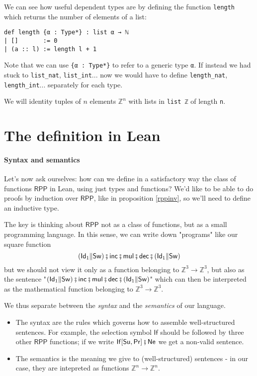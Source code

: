 \documentclass{book}
\theoremstyle{definition}
\theoremstyle{remark}
\theoremstyle{plain}
\newcommand{\Z}{\mathbb{Z}}
\newcommand{\RPP}{\mathsf{RPP}}
\newcommand{\rppId}{\mathsf{Id}}
\newcommand{\rppNe}{\mathsf{Ne}}
\newcommand{\rppSu}{\mathsf{Su}}
\newcommand{\rppPr}{\mathsf{Pr}}
\newcommand{\rppSw}{\mathsf{Sw}}
\newcommand{\rppCo}{\fatsemi}
\newcommand{\rppPa}{\Vert}
\newcommand{\rppIf}{\mathsf{If}}
\newcommand{\rppinc}{\mathsf{inc}}
\newcommand{\rppdec}{\mathsf{dec}}
\newcommand{\rppmul}{\mathsf{mul}}
\begin{document}
We can see how useful dependent types are by defining the function \lstinline{length}
which returns the number of elements of a list:
\begin{lstlisting}
def length {α : Type*} : list α → ℕ
| []       := 0
| (a :: l) := length l + 1
\end{lstlisting}
Note that we can use \lstinline|{α : Type*}| to refer to a generic type \lstinline{α}.
If instead we had stuck to \lstinline{list_nat}, \lstinline{list_int}...
now we would have to define \lstinline{length_nat}, \lstinline{length_int}... separately for each type.

We will identity tuples of $n$ elements $\Z^n$ with lists in \lstinline{list ℤ} of length \lstinline{n}.

\section{The definition in Lean}

\paragraph{Syntax and semantics}
Let's now ask ourselves: how can we define in a satisfactory way the class of functions $\RPP$ in Lean,
using just types and functions?
We'd like to be able to do proofs by induction over $\RPP$, like in proposition \ref{rppinv}, so we'll need to define an inductive type.

The key is thinking about $\RPP$ not as a class of functions, but as a small programming language.
In this sense, we can write down "programs" like our square function
\[(\rppId_1 \rppPa \rppSw) \rppCo \rppinc \rppCo \rppmul \rppCo \rppdec \rppCo (\rppId_1 \rppPa \rppSw)\]
but we should not view it only as a function belonging to $\Z^3 \to \Z^3$,
but also as the sentence
"$(\rppId_1 \rppPa \rppSw) \rppCo \rppinc \rppCo \rppmul \rppCo \rppdec \rppCo (\rppId_1 \rppPa \rppSw)$"
which can then be interpreted as the mathematical function belonging to $\Z^3 \to \Z^3$.

We thus separate between the \textit{syntax} and the \textit{semantics} of our language.
\begin{itemize}
\item The syntax are the rules which governs how to assemble well-structured sentences.
For example, the selection symbol $\rppIf$ should be followed by three other $\RPP$ functions;
if we write $\rppIf[\rppSu, \rppPr] \rppCo \rppNe$ we get a non-valid sentence.
\item The semantics is the meaning we give to (well-structured) sentences -
in our case, they are intepreted as functions $\Z^n \to \Z^n$.
\end{itemize}
\end{document}
